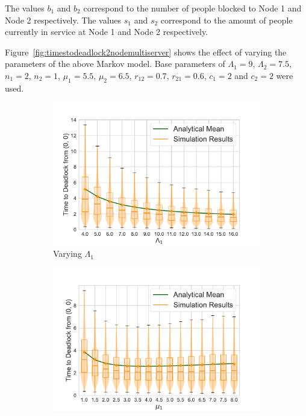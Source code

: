 \documentclass{article}
\numberwithin{equation}{section}
\begin{document}
The values $b_1$ and $b_2$ correspond to the number of people blocked to
Node 1 and Node 2 respectively.
The values $s_1$ and $s_2$ correspond to the amount of people currently in
service at Node 1 and Node 2 respectively.

Figure~\ref{fig:timestodeadlock2nodemultiserver} shows the effect of varying
the parameters of the above Markov model.
Base parameters of $\Lambda_1 = 9$, $\Lambda_2 = 7.5$, $n_1 = 2$, $n_2 = 1$,
$\mu_1 = 5.5$, $\mu_2 = 6.5$, $r_{12} = 0.7$, $r_{21} = 0.6$, $c_1 = 2$ and
$c_2 = 2$ were used.

\begin{figure}[!htbp]
  \begin{center}
  \begin{subfigure}[b]{0.48\textwidth}
    \includegraphics[width=\textwidth]{images/2Nms_varyL1}
    \caption{Varying $\Lambda_1$}
    \label{fig:2Nms_L}
  \end{subfigure}
  \begin{subfigure}[b]{0.48\textwidth}
    \includegraphics[width=\textwidth]{images/2Nms_varymu1}

\end{subfigure}
\end{center}
\end{figure}
\end{document}
